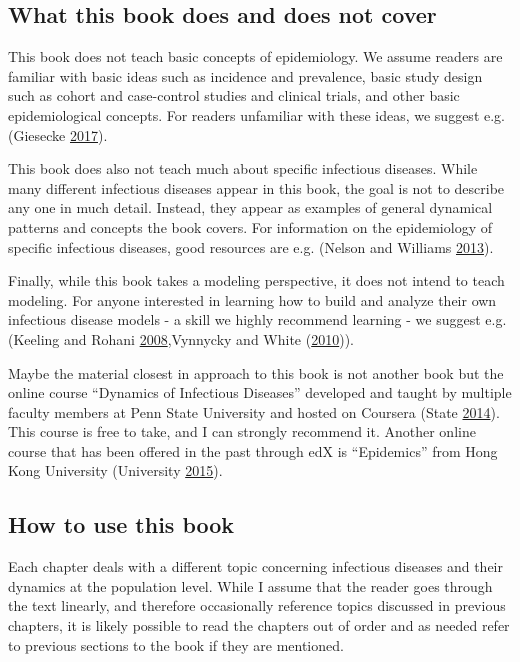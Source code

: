 \documentclass[]{article}
\theoremstyle{definition}
\theoremstyle{definition}
\theoremstyle{definition}
\theoremstyle{remark}
\begin{document}
\subsection{What this book does and does not
cover}\label{what-this-book-does-and-does-not-cover}

This book does not teach basic concepts of epidemiology. We assume
readers are familiar with basic ideas such as incidence and prevalence,
basic study design such as cohort and case-control studies and clinical
trials, and other basic epidemiological concepts. For readers unfamiliar
with these ideas, we suggest e.g. (Giesecke
\protect\hyperlink{ref-giesecke17}{2017}).

This book does also not teach much about specific infectious diseases.
While many different infectious diseases appear in this book, the goal
is not to describe any one in much detail. Instead, they appear as
examples of general dynamical patterns and concepts the book covers. For
information on the epidemiology of specific infectious diseases, good
resources are e.g. (Nelson and Williams
\protect\hyperlink{ref-nelson13}{2013}).

Finally, while this book takes a modeling perspective, it does not
intend to teach modeling. For anyone interested in learning how to build
and analyze their own infectious disease models - a skill we highly
recommend learning - we suggest e.g. (Keeling and Rohani
\protect\hyperlink{ref-keeling08}{2008},Vynnycky and White
(\protect\hyperlink{ref-vynnycky10}{2010})).

Maybe the material closest in approach to this book is not another book
but the online course ``Dynamics of Infectious Diseases'' developed and
taught by multiple faculty members at Penn State University and hosted
on Coursera (State \protect\hyperlink{ref-epimooc}{2014}). This course
is free to take, and I can strongly recommend it. Another online course
that has been offered in the past through edX is ``Epidemics'' from Hong
Kong University (University \protect\hyperlink{ref-hkepidemics}{2015}).

\subsection{How to use this book}\label{how-to-use-this-book}

Each chapter deals with a different topic concerning infectious diseases
and their dynamics at the population level. While I assume that the
reader goes through the text linearly, and therefore occasionally
reference topics discussed in previous chapters, it is likely possible
to read the chapters out of order and as needed refer to previous
sections to the book if they are mentioned.
\end{document}
